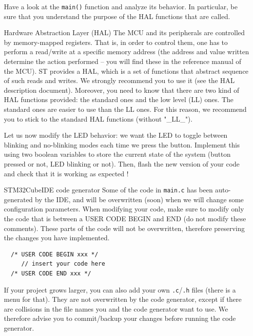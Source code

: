 Have a look at the \texttt{main()} function and analyze its behavior. In particular, be sure that you understand the purpose of the HAL functions that are called.

\begin{bclogo}[couleur = gray!20, arrondi = 0.2, logo=\bcinfo]{Hardware Abstraction Layer (HAL)}
The MCU and its peripherals are controlled by memory-mapped registers. That is, in order to control them, one has to perform a read/write at a specific memory address (the address and value written determine the action performed -- you will find these in the reference manual of the MCU).
ST provides a HAL, which is a set of functions that abstract sequence of such reads and writes. We strongly recommend you to use it (see the HAL description document). Moreover, you need to know that there are two kind of HAL functions provided: the standard ones and the low level (LL) ones. The standard ones are easier to use than the LL ones. For this reason, we recommend you to stick to the standard HAL functions (without "\_LL\_").
\end{bclogo}

Let us now modify the LED behavior: we want the LED to toggle between blinking and no-blinking modes each time we press the button. Implement this using two boolean variables to store the current state of the system (button pressed or not, LED blinking or not). Then, flash the new version of your code and check that it is working as expected !

\begin{bclogo}[couleur = gray!20, arrondi = 0.2, logo=\bcattention]{STM32CubeIDE code generator}
Some of the code in \texttt{main.c} has been auto-generated by the IDE, and will be overwritten (soon) when we will change some configuration parameters.
When modifying your code, make sure to modify only the code that is between a USER CODE BEGIN and END (do not modify these comments). These parts of the code will not be overwritten, therefore preserving the changes you have implemented.
\begin{lstlisting}
  /* USER CODE BEGIN xxx */
     // insert your code here
  /* USER CODE END xxx */
\end{lstlisting}

If your project grows larger, you can also add your own \texttt{.c}/\texttt{.h} files (there is a menu for that). They are not overwritten by the code generator, except if there are collisions in the file names you and the code generator want to use. We therefore advise you to commit/backup your changes before running the code generator.
\end{bclogo}



